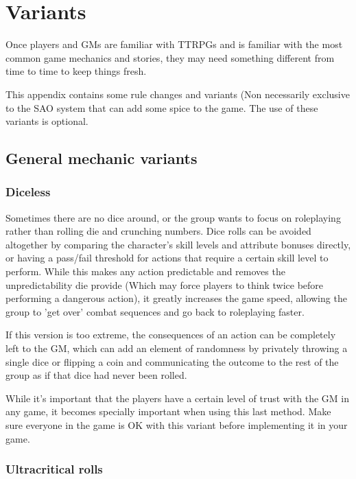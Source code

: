 \chapter{Variants}

Once players and GMs are familiar with TTRPGs and is familiar with the most common game mechanics and stories, they may need something different from time to time to keep things fresh. 
\par
This appendix contains some rule changes and variants (Non necessarily exclusive to the SAO system that can add some spice to the game. The use of these variants is optional.

\section{General mechanic variants}

\subsection*{Diceless}

Sometimes there are no dice around, or the group wants to focus on roleplaying rather than rolling die and crunching numbers. Dice rolls can be avoided altogether by comparing the character's skill levels and attribute bonuses directly, or having a pass/fail threshold for actions that require a certain skill level to perform. While this makes any action predictable and removes the unpredictability die provide (Which may force players to think twice before performing a dangerous action), it greatly increases the game speed, allowing the group to 'get over' combat sequences and go back to roleplaying faster.
\par 
If this version is too extreme, the consequences of an action can be completely left to the GM, which can add an element of randomness by privately throwing a single dice or flipping a coin and communicating the outcome to the rest of the group as if that dice had never been rolled.
\par 
While it's important that the players have a certain level of trust with the GM in any game, it becomes specially important when using this last method. Make sure everyone in the game is OK with this variant before implementing it in your game.

\subsection*{Ultracritical rolls}


